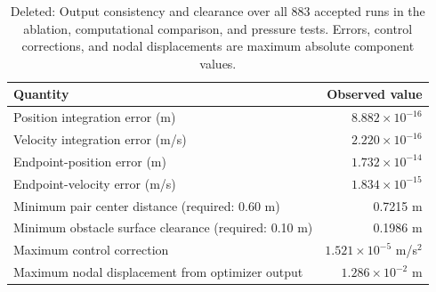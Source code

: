 \documentclass[electronics,article,submit,moreauthors]{Definitions/mdpi}
\providecommand{\DIFdelbegin}{}\providecommand{\DIFdelend}{} %
\begin{document}
\DIFdelbegin 
\begin{table}[htbp]
\begin{mdframed}[linecolor=RevisionRed,linewidth=.65pt,innerleftmargin=2pt,innerrightmargin=2pt,innertopmargin=3pt,innerbottommargin=3pt]
\color{RevisionRed}
\setlength{\textwidth}{\linewidth}\setlength{\fulllength}{\linewidth}

\caption*{\textcolor{RevisionRed}{Deleted:} Output consistency and clearance over all 883 accepted runs in the ablation, computational comparison, and pressure tests. Errors, control corrections, and nodal displacements are maximum absolute component values.}
\small\begin{tabularx}{\textwidth}{Yr}
\toprule Quantity & Observed value \\
\midrule
Position integration error (m) & $8.882\times10^{-16}$ \\
Velocity integration error (m/s) & $2.220\times10^{-16}$ \\
Endpoint-position error (m) & $1.732\times10^{-14}$ \\
Endpoint-velocity error (m/s) & $1.834\times10^{-15}$ \\
Minimum pair center distance (required: 0.60 m) & 0.7215 m \\
Minimum obstacle surface clearance (required: 0.10 m) & 0.1986 m \\
Maximum control correction & $1.521\times10^{-5}$ m/s$^2$ \\
Maximum nodal displacement from optimizer output & $1.286\times10^{-2}$ m \\
\bottomrule\end{tabularx}
\end{mdframed}
\end{table}
\end{document}
